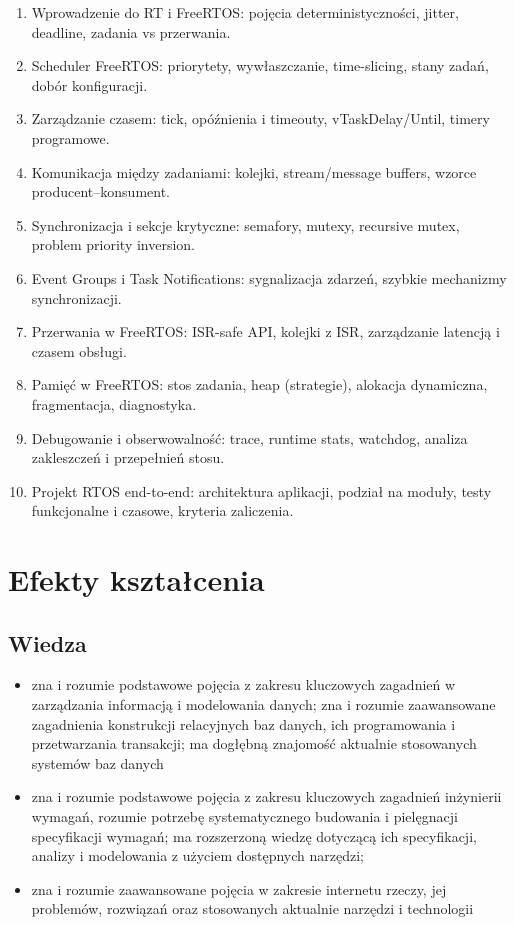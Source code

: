 \documentclass[12pt, a4paper]{article}
\begin{document}
\begin{enumerate}
  \item Wprowadzenie do RT i FreeRTOS: pojęcia deterministyczności, jitter, deadline, zadania vs przerwania.
  \item Scheduler FreeRTOS: priorytety, wywłaszczanie, time-slicing, stany zadań, dobór konfiguracji.
  \item Zarządzanie czasem: tick, opóźnienia i timeouty, vTaskDelay/Until, timery programowe.
  \item Komunikacja między zadaniami: kolejki, stream/message buffers, wzorce producent–konsument.
  \item Synchronizacja i sekcje krytyczne: semafory, mutexy, recursive mutex, problem priority inversion.
  \item Event Groups i Task Notifications: sygnalizacja zdarzeń, szybkie mechanizmy synchronizacji.
  \item Przerwania w FreeRTOS: ISR-safe API, kolejki z ISR, zarządzanie latencją i czasem obsługi.
  \item Pamięć w FreeRTOS: stos zadania, heap (strategie), alokacja dynamiczna, fragmentacja, diagnostyka.
  \item Debugowanie i obserwowalność: trace, runtime stats, watchdog, analiza zakleszczeń i przepełnień stosu.
  \item Projekt RTOS end-to-end: architektura aplikacji, podział na moduły, testy funkcjonalne i czasowe, kryteria zaliczenia.
\end{enumerate}

\section{Efekty kształcenia}

\subsection*{Wiedza}
\begin{itemize}
  \item zna i rozumie podstawowe pojęcia z zakresu kluczowych zagadnień w zarządzania informacją i modelowania danych; zna i rozumie zaawansowane zagadnienia konstrukcji relacyjnych baz danych, ich programowania i przetwarzania transakcji; ma dogłębną znajomość aktualnie stosowanych systemów baz danych
  \item zna i rozumie podstawowe pojęcia z zakresu kluczowych zagadnień inżynierii wymagań, rozumie potrzebę systematycznego budowania i pielęgnacji specyfikacji wymagań; ma rozszerzoną wiedzę dotyczącą  ich specyfikacji, analizy i modelowania z użyciem dostępnych narzędzi;
  \item zna i rozumie zaawansowane pojęcia w zakresie internetu rzeczy, jej problemów, rozwiązań oraz stosowanych aktualnie narzędzi i technologii
\end{itemize}
\end{document}

